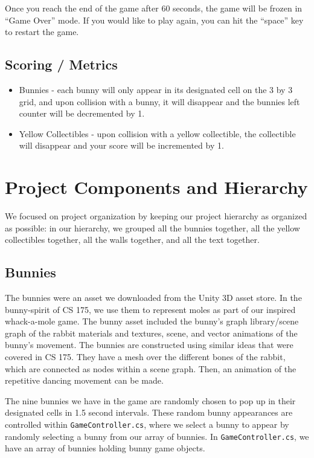 \documentclass[12pt]{article}
\begin{document}
  Once you reach the end of the game after 60 seconds, the game will be frozen in ``Game Over'' mode. If you would like to play again, you can hit the ``space'' key to restart the game.

\subsection{Scoring / Metrics}
\begin{itemize}
  \item Bunnies - each bunny will only appear in its designated cell on the 3 by 3 grid, and upon collision with a bunny, it will disappear and the bunnies left counter will be decremented by 1. 
  \item Yellow Collectibles - upon collision with a yellow collectible, the collectible will disappear and your score will be incremented by 1.
\end{itemize}


\section{Project Components and Hierarchy}
  We focused on project organization by keeping our project hierarchy as organized as possible: in our hierarchy, we grouped all the bunnies together, all the yellow collectibles together, all the walls together, and all the text together.

\subsection{Bunnies}
  The bunnies were an asset we downloaded from the Unity 3D asset store. In the bunny-spirit of CS 175, we use them to represent moles as part of our inspired whack-a-mole game. The bunny asset included the bunny's graph library/scene graph of the rabbit materials and textures, scene, and  vector animations of the bunny's movement. The bunnies are constructed using similar ideas that were covered in CS 175. They have a mesh over the different bones of the rabbit, which are connected as nodes within a scene graph. Then, an animation of the repetitive dancing movement can be made. 

  The nine bunnies we have in the game are randomly chosen to pop up in their designated cells in 1.5 second intervals. These random bunny appearances are controlled within \verb+GameController.cs+, where we select a bunny to appear by randomly selecting a bunny from our array of bunnies. In \verb+GameController.cs+, we have an array of bunnies holding bunny game objects.
\end{document}

